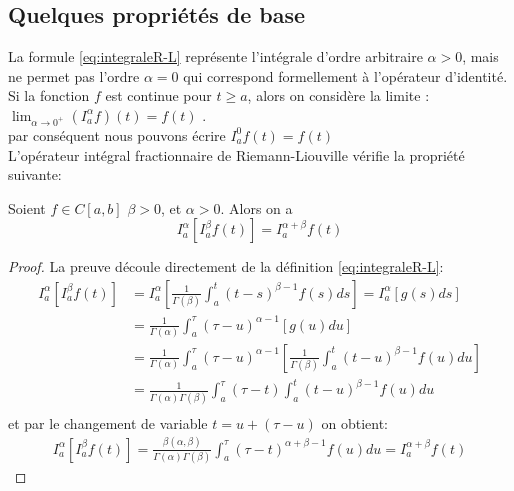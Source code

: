 \subsection{Quelques propriétés de base}
    La formule \ref{eq:integraleR-L} représente l'intégrale d'ordre arbitraire $\alpha > 0$, mais ne permet pas l'ordre $\alpha = 0$ qui correspond formellement à l'opérateur d'identité. \\
    Si la fonction $f$ est continue pour $t \geq a$, alors on considère la limite : $\lim_{\alpha\to 0^+} (I_{a}^{\alpha}f)(t) = f(t)$ \cite{FDEs_intro}.\\
    par conséquent nous pouvons écrire $I_a^0 f(t)=f(t)$ \\
L'opérateur intégral fractionnaire de Riemann-Liouville vérifie la propriété suivante:
\begin{proposition}
    Soient $f \in C[a,b]$ $\beta >0$, et $\alpha >0$. Alors on a 
    \begin{equation}
        I_{a}^{\alpha}[I_{a}^{\beta}f(t)] = I_{a}^{\alpha + \beta} f(t)
    \end{equation}
\end{proposition}
\begin{proof}
La preuve découle directement de la définition \ref{eq:integraleR-L}:
    \begin{align*}
        I_a^{\alpha}[I_a^{\beta}f(t)] &= I_a^{\alpha}[\frac{1}{\Gamma(\beta)} \int_{a}^{t} (t-s)^{\beta-1} f(s) ds] = I_a^{\alpha}[g(s)ds]\\
        &= \frac{1}{\Gamma(\alpha)} \int_{a}^{\tau} (\tau - u)^{\alpha - 1} [g(u) du] \\
        &= \frac{1}{\Gamma(\alpha)} \int_{a}^{\tau} (\tau - u)^{\alpha - 1} \left[\frac{1}{\Gamma(\beta)} \int _{a}^{t} (t-u)^{\beta - 1} f(u)du\right] \\
        &= \frac{1}{\Gamma(\alpha) \Gamma(\beta)} \int_{a}^{\tau} (\tau - t) \int_{a}^{t}(t-u)^{\beta - 1} f(u)du\\
    \end{align*}
    et par le changement de variable $ t = u + (\tau - u)$ on obtient:\\
    \begin{align*}
        I_{a}^{\alpha}[I_{a}^{\beta}f(t)] = \frac{\beta(\alpha, \beta)}{\Gamma(\alpha) \Gamma(\beta)} \int_{a}^{\tau} (\tau - t)^{\alpha + \beta - 1} f(u) du = I_{a}^{\alpha + \beta} f(t)
    \end{align*}
\end{proof}

